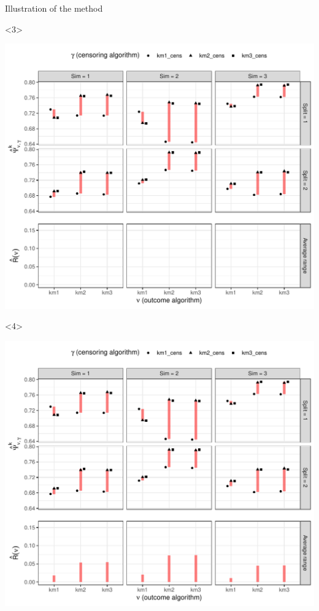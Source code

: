 \documentclass[smaller]{beamer}\usepackage{listings}
\begin{document}
\begin{frame}[label={sec:org532821c},fragile]{Illustration of the method}
\begin{onlyenv}
\begin{onlyenv}<3>
\begin{center}
\includegraphics[width=.9\linewidth]{fig-illustrate-fluct-risk2.pdf}
\end{center}
\end{onlyenv}

\begin{onlyenv}<4>
\begin{center}
\includegraphics[width=.9\linewidth]{fig-illustrate-fluct-risk3.pdf}
\end{center}
\end{onlyenv}
\end{onlyenv}
\end{frame}
\end{document}
